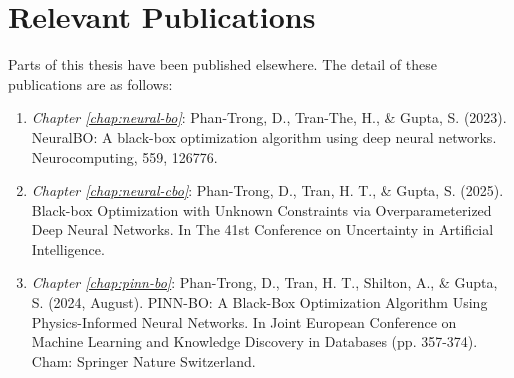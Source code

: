 \chapter*{Relevant Publications}
{}
Parts of this thesis have been published elsewhere. The detail of these publications are as follows:

\begin{enumerate}
    \item \textit{Chapter \ref{chap:neural-bo}}: Phan-Trong, D., Tran-The, H., \& Gupta, S. (2023). NeuralBO: A black-box optimization algorithm using deep neural networks. Neurocomputing, 559, 126776.
    \item \textit{Chapter \ref{chap:neural-cbo}}: Phan-Trong, D., Tran, H. T., \& Gupta, S. (2025). Black-box Optimization with Unknown Constraints via Overparameterized Deep Neural Networks. In The 41st Conference on Uncertainty in Artificial Intelligence.  
    \item \textit{Chapter \ref{chap:pinn-bo}}: Phan-Trong, D., Tran, H. T., Shilton, A., \& Gupta, S. (2024, August). PINN-BO: A Black-Box Optimization Algorithm Using Physics-Informed Neural Networks. In Joint European Conference on Machine Learning and Knowledge Discovery in Databases (pp. 357-374). Cham: Springer Nature Switzerland.
\end{enumerate}